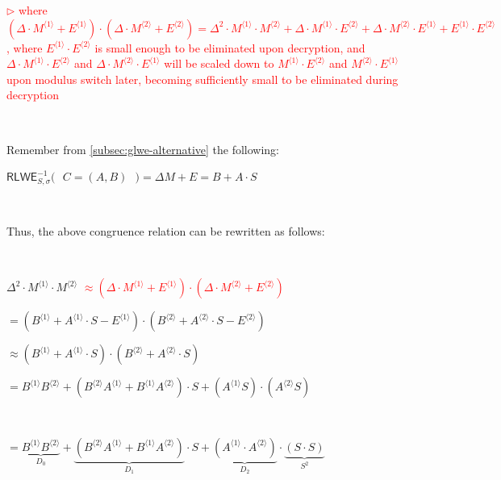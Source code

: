 \textcolor{red}{ $\rhd$ where $(\Delta \cdot M^{\langle 1 \rangle} + E^{\langle 1 \rangle} ) \cdot ( \Delta \cdot M^{\langle 2 \rangle} + E^{\langle 2 \rangle} ) = \Delta^2\cdot M^{\langle 1 \rangle} \cdot M^{\langle 2 \rangle} + \Delta \cdot M^{\langle 1 \rangle} \cdot E^{\langle 2 \rangle} + \Delta \cdot M^{\langle 2 \rangle} \cdot E^{\langle 1 \rangle} + E^{\langle 1 \rangle} \cdot E^{\langle 2 \rangle}$, where $E^{\langle 1 \rangle} \cdot E^{\langle 2 \rangle}$ is small enough to be eliminated upon decryption, and $\Delta \cdot M^{\langle 1 \rangle} \cdot E^{\langle 2 \rangle}$ and $\Delta \cdot M^{\langle 2 \rangle} \cdot E^{\langle 1 \rangle}$ will be scaled down to $M^{\langle 1 \rangle} \cdot E^{\langle 2 \rangle}$ and $M^{\langle 2 \rangle} \cdot E^{\langle 1 \rangle}$ upon modulus switch later, becoming sufficiently small to be eliminated during decryption}

$ $

Remember from \autoref{subsec:glwe-alternative} the following: 

$\textsf{RLWE}^{-1}_{S,\sigma}\bm{(} \text{ } C = (A, B) \text{ } \bm{)} = \Delta  M + E = B + A\cdot S$ 

$ $

Thus, the above congruence relation can be rewritten as follows:

$ $

$\Delta^2 \cdot M^{\langle 1 \rangle} \cdot M^{\langle 2 \rangle}$ \textcolor{red}{$ \approx (\Delta \cdot M^{\langle 1 \rangle} + E^{\langle 1 \rangle} ) \cdot ( \Delta \cdot M^{\langle 2 \rangle} + E^{\langle 2 \rangle} )$}

$ = (B^{\langle 1 \rangle}  + A^{\langle 1 \rangle} \cdot S - E^{\langle 1 \rangle}) \cdot (B^{\langle 2 \rangle}  + A^{\langle 2 \rangle} \cdot S - E^{\langle 2 \rangle})$

$ \approx (B^{\langle 1 \rangle}  + A^{\langle 1 \rangle} \cdot S) \cdot (B^{\langle 2 \rangle}  + A^{\langle 2 \rangle} \cdot S)$




$ = B^{\langle 1 \rangle}B^{\langle 2 \rangle}  + (B^{\langle 2 \rangle}A^{\langle 1 \rangle} + B^{\langle 1 \rangle}A^{\langle 2 \rangle}) \cdot S  + (A^{\langle 1 \rangle}S)\cdot(A^{\langle 2 \rangle}S)$

$ $



$ = \underbrace{B^{\langle 1 \rangle}B^{\langle 2 \rangle}}_{D_0}  + \underbrace{(B^{\langle 2 \rangle}A^{\langle 1 \rangle} + B^{\langle 1 \rangle}A^{\langle 2 \rangle})}_{D_1} \cdot S + \underbrace{(A^{\langle 1 \rangle} \cdot A^{\langle 2 \rangle})}_{D_2} \cdot \underbrace{(S \cdot S)}_{ S^2}$

